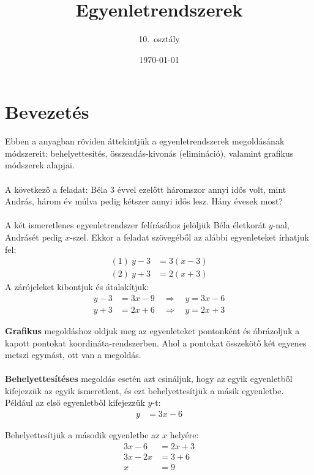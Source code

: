 \documentclass[12pt,a4paper]{article}
\title{Egyenletrendszerek}
\author{10.\ osztály}
\date{\today}
\begin{document}
\maketitle

\section*{Bevezetés}
\noindent Ebben a anyagban röviden áttekintjük a egyenletrendszerek megoldásának módszereit:
 behelyettesítés, összeadás-kivonás (elimináció), valamint grafikus módszerek alapjai.
\\\\
\noindent A következő a feladat:
Béla 3 évvel ezelőtt háromszor annyi idős volt, mint András, három év múlva pedig kétszer annyi idős lesz. Hány évesek most?
\\\\
\noindent A két ismeretlenes egyenletrendszer felírásához jelöljük Béla életkorát $y$-nal, Andrásét pedig $x$-szel. 
Ekkor a feladat szövegéből az alábbi egyenleteket írhatjuk fel:
\begin{align*}
	(1)\ y-3 &= 3(x-3)\\
	(2)\ y+3 &= 2(x+3)
\end{align*}
\noindent A zárójeleket kibontjuk és átalakítjuk:
\begin{align*}
	y - 3 &= 3x - 9 \quad \Rightarrow \quad y=3x-6\\ 
	y + 3 &= 2x + 6 \quad \Rightarrow \quad y=2x+3
\end{align*}

\noindent \textbf{Grafikus} megoldáshoz oldjuk meg az egyenleteket pontonként és ábrázoljuk a kapott pontokat koordináta-rendszerben. 
Ahol a pontokat összekötő két egyenes metszi egymást, ott van a megoldás.
\\\\
\textbf{Behelyettesítéses} megoldás esetén azt csináljuk, hogy az egyik egyenletből kifejezzük az egyik ismeretlent, és ezt behelyettesítjük a másik egyenletbe. 
Például az első egyenletből kifejezzük $y$-t:
\begin{align*}
	y &= 3x - 6 
\end{align*}

\noindent Behelyettesítjük a második egyenletbe az $x$ helyére:
\begin{align*}	
	3x - 6 &= 2x + 3 \\
	3x - 2x &= 3 + 6 \\
	x &= 9
\end{align*}
\end{document}
